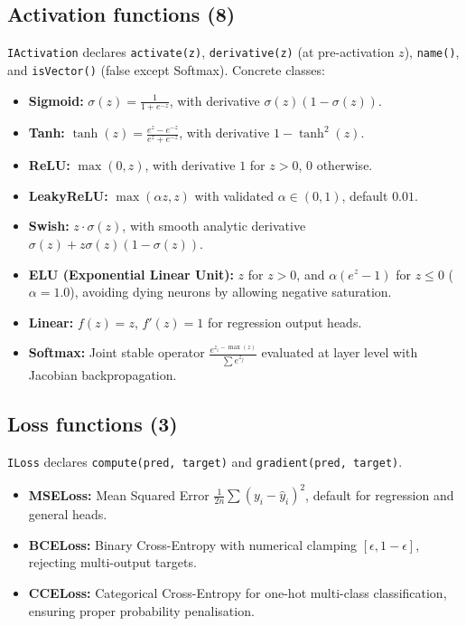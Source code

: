 \documentclass[11pt,a4paper]{article}
\begin{document}
\subsection{Activation functions (8)}
\texttt{IActivation} declares \texttt{activate(z)}, \texttt{derivative(z)} (at pre-activation $z$), \texttt{name()}, and \texttt{isVector()} (false except Softmax). Concrete classes:
\begin{itemize}[itemsep=1pt]
    \item \textbf{Sigmoid:} $\sigma(z) = \frac{1}{1 + e^{-z}}$, with derivative $\sigma(z)(1 - \sigma(z))$.
    \item \textbf{Tanh:} $\tanh(z) = \frac{e^z - e^{-z}}{e^z + e^{-z}}$, with derivative $1 - \tanh^2(z)$.
    \item \textbf{ReLU:} $\max(0, z)$, with derivative $1$ for $z > 0$, $0$ otherwise.
    \item \textbf{LeakyReLU:} $\max(\alpha z, z)$ with validated $\alpha \in (0, 1)$, default $0.01$.
    \item \textbf{Swish:} $z \cdot \sigma(z)$, with smooth analytic derivative $\sigma(z) + z\sigma(z)(1 - \sigma(z))$.
    \item \textbf{ELU (Exponential Linear Unit):} $z$ for $z > 0$, and $\alpha(e^z - 1)$ for $z \le 0$ ($\alpha = 1.0$), avoiding dying neurons by allowing negative saturation.
    \item \textbf{Linear:} $f(z) = z$, $f'(z) = 1$ for regression output heads.
    \item \textbf{Softmax:} Joint stable operator $\frac{e^{z_i - \max(z)}}{\sum e^{z_j}}$ evaluated at layer level with Jacobian backpropagation.
\end{itemize}

\subsection{Loss functions (3)}
\texttt{ILoss} declares \texttt{compute(pred, target)} and \texttt{gradient(pred, target)}.
\begin{itemize}[itemsep=1pt]
    \item \textbf{MSELoss:} Mean Squared Error $\frac{1}{2n}\sum (y_i - \hat{y}_i)^2$, default for regression and general heads.
    \item \textbf{BCELoss:} Binary Cross-Entropy with numerical clamping $[\epsilon, 1-\epsilon]$, rejecting multi-output targets.
    \item \textbf{CCELoss:} Categorical Cross-Entropy for one-hot multi-class classification, ensuring proper probability penalisation.
\end{itemize}
\end{document}
